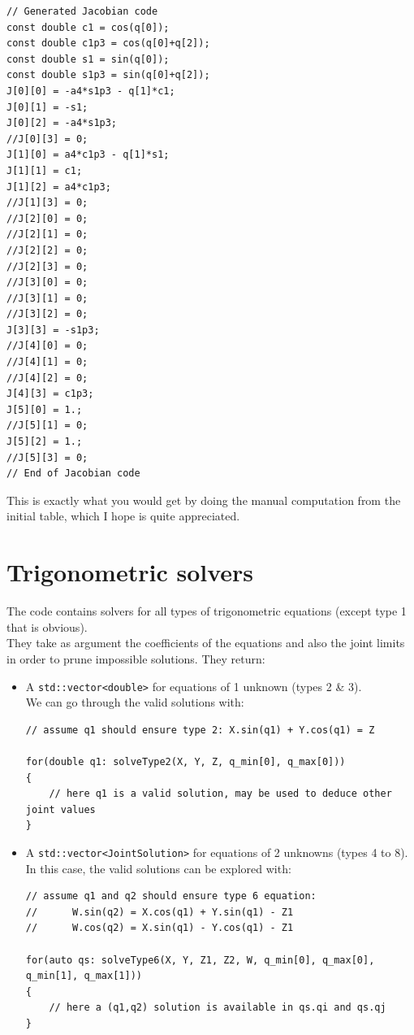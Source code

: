 \documentclass{ecnreport}
\begin{document}
\begin{minipage}{.1\linewidth}
	\quad\quad
\end{minipage}
\begin{minipage}{.45\linewidth}
\cppstyle \raggedright
\begin{lstlisting}
// Generated Jacobian code
const double c1 = cos(q[0]);
const double c1p3 = cos(q[0]+q[2]);
const double s1 = sin(q[0]);
const double s1p3 = sin(q[0]+q[2]);
J[0][0] = -a4*s1p3 - q[1]*c1;
J[0][1] = -s1;
J[0][2] = -a4*s1p3;
//J[0][3] = 0;
J[1][0] = a4*c1p3 - q[1]*s1;
J[1][1] = c1;
J[1][2] = a4*c1p3;
//J[1][3] = 0;
//J[2][0] = 0;
//J[2][1] = 0;
//J[2][2] = 0;
//J[2][3] = 0;
//J[3][0] = 0;
//J[3][1] = 0;
//J[3][2] = 0;
J[3][3] = -s1p3;
//J[4][0] = 0;
//J[4][1] = 0;
//J[4][2] = 0;
J[4][3] = c1p3;
J[5][0] = 1.;
//J[5][1] = 0;
J[5][2] = 1.;
//J[5][3] = 0;
// End of Jacobian code
\end{lstlisting}	
\end{minipage}
This is exactly what you would get by doing the manual computation from the initial table, which I hope is quite appreciated.

\newpage
\section{Trigonometric solvers}\label{trigsolve}

The code contains solvers for all types of trigonometric equations (except type 1 that is obvious).\\
They take as argument the coefficients of the equations and also the joint limits in order to prune impossible solutions. They return:
\begin{itemize}
	\item A \texttt{std::vector<double>} for equations of 1 unknown (types 2 \& 3).\\We can go through the valid solutions with:
\cppstyle
	\begin{lstlisting}
// assume q1 should ensure type 2: X.sin(q1) + Y.cos(q1) = Z

for(double q1: solveType2(X, Y, Z, q_min[0], q_max[0]))
{
	// here q1 is a valid solution, may be used to deduce other joint values
}
	\end{lstlisting}
	\item A \texttt{std::vector<JointSolution>} for equations of 2 unknowns (types 4 to 8).\\In this case, the valid solutions can be explored with:
	\cppstyle
	\begin{lstlisting}
// assume q1 and q2 should ensure type 6 equation: 
//		W.sin(q2) = X.cos(q1) + Y.sin(q1) - Z1
//		W.cos(q2) = X.sin(q1) - Y.cos(q1) - Z1

for(auto qs: solveType6(X, Y, Z1, Z2, W, q_min[0], q_max[0], q_min[1], q_max[1]))
{
	// here a (q1,q2) solution is available in qs.qi and qs.qj
}
	\end{lstlisting}
\end{itemize}
\end{document}
